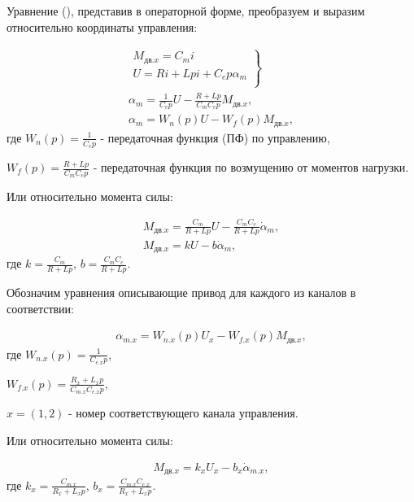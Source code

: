 Уравнение (), представив в операторной форме, преобразуем и выразим относительно координаты управления:

\begin{equation}
\label{eq:p3:lin2}
\begin{multlined}
\left.
\begin{matrix}
M_{\textit{дв.x}} = C_m i\\
U = R i + L p i + C_e p \alpha_m \\
\end{matrix}
\right\rbrace \\
\alpha_m = \frac{1}{C_e p} U - \frac{R + L p}{C_m C_e p} M_{\textit{дв.x}},\\
\alpha_m = W_n(p) U - W_f(p) M_{\textit{дв.x}},
\end{multlined}
\end{equation}
где
$W_n(p) = \frac{1}{C_e p}$ - передаточная функция (ПФ) по управлению,

$W_f(p) = \frac{R + L p}{C_m C_e p}$ - передаточная функция по возмущению от моментов нагрузки.

Или относительно момента силы:

\begin{equation}
\label{eq:p3:lin2+}
\begin{multlined}
M_{\textit{дв.x}} = \frac{C_m}{R + L p} U - \frac{C_m C_e}{R + L p} \dot\alpha_m,\\
M_{\textit{дв.x}} = k U - b \dot\alpha_m,
\end{multlined}
\end{equation}
где
$k = \frac{C_m}{R + L p}$,
$b = \frac{C_m C_e}{R + L p}$.

Обозначим уравнения описывающие привод для каждого из каналов в соответствии:

\begin{equation}
\label{eq:p3:lin3}
\begin{multlined}
\alpha_{m.x} = W_{n.x}(p) U_x - W_{f.x}(p) M_{\textit{дв.x}},
\end{multlined}
\end{equation}
где 
$W_{n.x}(p) = \frac{1}{C_{e.x} p}$,

$W_{f.x}(p) = \frac{R_x + L_x p}{C_{m.x} C_{e.x} p}$,

$x = (1,2)$ - номер соответствующего канала управления.

Или относительно момента силы:

\begin{equation}
\label{eq:p3:lin4}
\begin{multlined}
M_{\textit{дв.x}} = k_x U_x - b_x \dot\alpha_{m.x},
\end{multlined}
\end{equation}
где
$k_x = \frac{C_{m.x}}{R_x + L_x p}$,
$b_x = \frac{C_{m.x} C_{e.x}}{R_x + L_x p}$.

